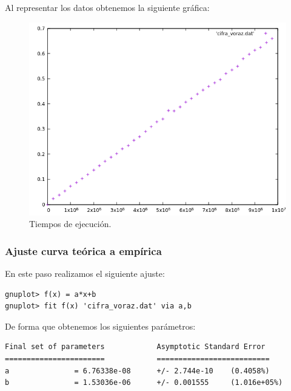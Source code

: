 Al representar los datos obtenemos la siguiente gráfica:

\begin{figure}[H]
    \begin{center}
        \includegraphics[scale=0.7]{imagenes/cifra_voraz.png}
        \caption{Tiempos de ejecución.}
        \label{fig2}
    \end{center}
\end{figure}

\subsubsection{Ajuste curva teórica a empírica}

En este paso realizamos el siguiente ajuste:
\begin{shaded*}
\begin{verbatim}
gnuplot> f(x) = a*x+b
gnuplot> fit f(x) 'cifra_voraz.dat' via a,b

\end{verbatim}
\end{shaded*}

De forma que obtenemos los siguientes parámetros:

\begin{shaded*}
\begin{verbatim}
Final set of parameters            Asymptotic Standard Error
=======================            ==========================
a               = 6.76338e-08      +/- 2.744e-10    (0.4058%)
b               = 1.53036e-06      +/- 0.001555     (1.016e+05%)

\end{verbatim}
\end{shaded*}

